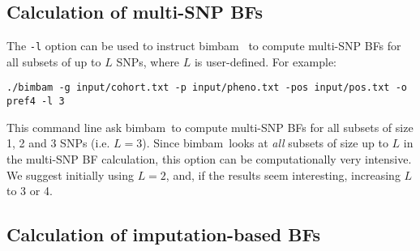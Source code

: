 \documentclass[11pt,Palatino]{article}
\def\bimbam{{\sc bimbam}~}
\begin{document}



\subsection {Calculation of multi-SNP BFs}

The {\tt -l} option can be used to instruct \bimbam
to compute multi-SNP BFs for all subsets of up to $L$ SNPs, where $L$ is user-defined. 
For example: 
\begin{verbatim}
./bimbam -g input/cohort.txt -p input/pheno.txt -pos input/pos.txt -o pref4 -l 3
\end{verbatim}
This command line ask \bimbam to compute multi-SNP BFs for all subsets of size 1, 2 and 3 SNPs (i.e. $L=3$).  Since \bimbam looks at {\it all} subsets of size up to $L$ in the multi-SNP BF calculation, this option can be computationally very intensive.
We suggest initially using $L=2$, and, if the results seem interesting, increasing $L$ to 3 or 4. 


\subsection{Calculation of imputation-based BFs}

\end{document}
